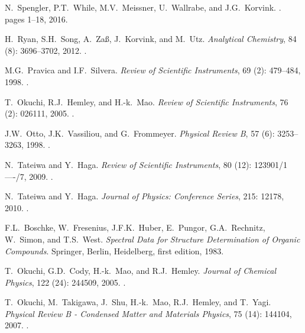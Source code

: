 \documentclass[aip,rsi,reprint,graphicx]{revtex4-1} %
\begin{document}
\begin{thebibliography}{57}
N.~Spengler, P.T.~While, M.V.~Meissner, U.~Wallrabe, and J.G.~Korvink.
.
\newblock pages 1--18, 2016.

H.~Ryan, S.H.~Song, A.~Za{\ss}, J.~Korvink, and M.~Utz.
\newblock \emph{Analytical Chemistry}, 84 (8): 3696--3702,
  2012.
\newblock {}.

M.G.~Pravica and I.F.~Silvera.
\newblock \emph{Review of Scientific Instruments}, 69 (2):
  479--484, 1998.
\newblock {}.

T.~Okuchi, R.J.~Hemley, and H.-k.~Mao.
\newblock \emph{Review of Scientific Instruments}, 76 (2):
  026111, 2005{}.
\newblock {}.

J.W.~Otto, J.K.~Vassiliou, and G.~Frommeyer.
\newblock \emph{Physical Review B}, 57 (6): 3253--3263, 1998.
\newblock {}.

N.~Tateiwa and Y.~Haga.
\newblock \emph{Review of Scientific Instruments}, 80 (12):
  123901/1----/7, 2009.
\newblock {}.

N.~Tateiwa and Y.~Haga.
\newblock \emph{Journal of Physics: Conference Series}, 215: 12178,
  2010.
\newblock {}.

F.L.~Boschke, W.~Fresenius, J.F.K.~Huber, E.~Pungor, G.A.~Rechnitz,
  W.~Simon, and T.S.~West.
\newblock \emph{{Spectral Data for Structure Determination of Organic
  Compounds}}.
\newblock Springer, Berlin, Heidelberg, first edition, 1983.

T.~Okuchi, G.D.~Cody, H.-k.~Mao, and R.J.~Hemley.
\newblock \emph{Journal of Chemical Physics}, 122 (24):
  244509, 2005{}.
\newblock {}.

T.~Okuchi, M.~Takigawa, J.~Shu, H.-k.~Mao, R.J.~Hemley, and T.~Yagi.
\newblock \emph{Physical Review B - Condensed Matter and Materials Physics},
  75 (14): 144104, 2007.
\newblock {}.


\end{thebibliography}
\end{document}
